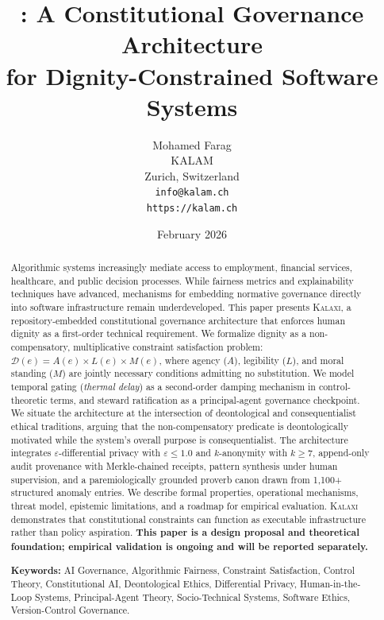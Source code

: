 \documentclass[12pt,a4paper]{article}
\title{\textbf{\kalaxi: A Constitutional Governance Architecture\\
for Dignity-Constrained Software Systems}}
\author{
  Mohamed Farag\\
  KALAM\\
  Zurich, Switzerland\\
  \texttt{info@kalam.ch}\\
  \texttt{https://kalam.ch}
}
\date{February 2026}
\theoremstyle{definition}
\theoremstyle{remark}
\newcommand{\kalaxi}{\textsc{Kalaxi}}
\newcommand{\D}{\mathcal{D}}
\begin{document}
\maketitle
\thispagestyle{empty}

\begin{abstract}
Algorithmic systems increasingly mediate access to employment, financial services,
healthcare, and public decision processes. While fairness metrics and explainability
techniques have advanced, mechanisms for embedding normative governance directly into
software infrastructure remain underdeveloped. This paper presents \kalaxi{}, a
repository-embedded constitutional governance architecture that enforces human dignity
as a first-order technical requirement. We formalize dignity as a non-compensatory,
multiplicative constraint satisfaction problem: $\D(e) = A(e) \times L(e) \times M(e)$,
where agency ($A$), legibility ($L$), and moral standing ($M$) are jointly necessary
conditions admitting no substitution. We model temporal gating (\emph{thermal delay})
as a second-order damping mechanism in control-theoretic terms, and steward ratification
as a principal-agent governance checkpoint. We situate the architecture at the
intersection of deontological and consequentialist ethical traditions, arguing that the
non-compensatory predicate is deontologically motivated while the system's overall
purpose is consequentialist. The architecture integrates $\varepsilon$-differential
privacy with $\varepsilon \leq 1.0$ and $k$-anonymity with $k \geq 7$, append-only
audit provenance with Merkle-chained receipts, pattern synthesis under human supervision,
and a paremiologically grounded proverb canon drawn from 1{,}100+ structured anomaly
entries. We describe formal properties, operational mechanisms, threat model, epistemic
limitations, and a roadmap for empirical evaluation. \kalaxi{} demonstrates that
constitutional constraints can function as executable infrastructure rather than policy
aspiration. \textbf{This paper is a design proposal and theoretical foundation;
empirical validation is ongoing and will be reported separately.}

\medskip
\noindent\textbf{Keywords:} AI Governance, Algorithmic Fairness, Constraint Satisfaction,
Control Theory, Constitutional AI, Deontological Ethics, Differential Privacy,
Human-in-the-Loop Systems, Principal-Agent Theory, Socio-Technical Systems,
Software Ethics, Version-Control Governance.
\end{abstract}
\end{document}
